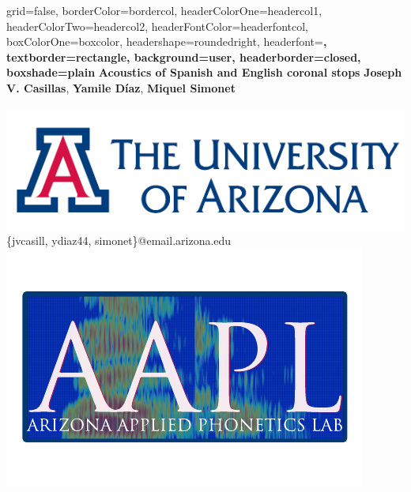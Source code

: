 \documentclass[a0paper,portrait,columns=2]{baposter}
\begin{document}
\begin{poster}{
grid=false,
borderColor=bordercol, %
headerColorOne=headercol1, %
headerColorTwo=headercol2, %
headerFontColor=headerfontcol, %
boxColorOne=boxcolor, %
headershape=roundedright, %
headerfont=\Large\sf\bf, %
textborder=rectangle,
background=user,
headerborder=closed, %
boxshade=plain
}
{}
%
%
{\sf\bf \LARGE{Acoustics of Spanish and English coronal stops}}
{\vspace{.6em} \textbf{Joseph V. Casillas}, \textbf{Yamile D\'iaz}, \textbf{Miquel Simonet}\\ 
 \\
{\hspace{-7in}\includegraphics[scale=0.2]{UA_logo}\phantom{.}} \\
{\vspace{-.4in}\smaller \{jvcasill, ydiaz44, simonet\}@email.arizona.edu} \\
{\vspace{-.45in}\phantom{.}\hspace{7in}\includegraphics[scale=0.35]{aalp_logo}}\vspace{-.6in}}





\end{poster}
\end{document}
